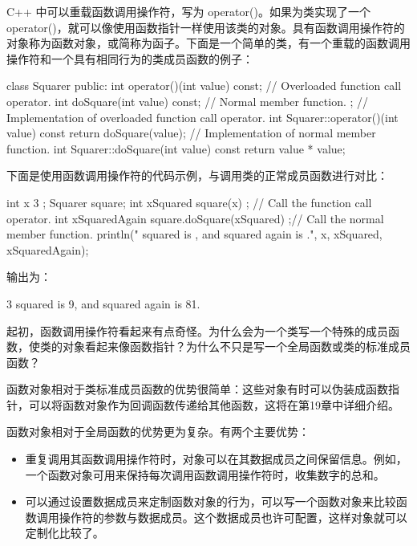 
C++ 中可以重载函数调用操作符，写为 operator()。如果为类实现了一个 operator()，就可以像使用函数指针一样使用该类的对象。具有函数调用操作符的对象称为函数对象，或简称为函子。下面是一个简单的类，有一个重载的函数调用操作符和一个具有相同行为的类成员函数的例子：

\begin{cpp}
class Squarer
{
    public:
        int operator()(int value) const; // Overloaded function call operator.
        int doSquare(int value) const; // Normal member function.
};
// Implementation of overloaded function call operator.
int Squarer::operator()(int value) const { return doSquare(value); }
// Implementation of normal member function.
int Squarer::doSquare(int value) const { return value * value; }
\end{cpp}

下面是使用函数调用操作符的代码示例，与调用类的正常成员函数进行对比：

\begin{cpp}
int x { 3 };
Squarer square;
int xSquared { square(x) }; // Call the function call operator.
int xSquaredAgain { square.doSquare(xSquared) };// Call the normal member function.
println("{} squared is {}, and squared again is {}.", x, xSquared, xSquaredAgain);
\end{cpp}

输出为：

\begin{shell}
3 squared is 9, and squared again is 81.
\end{shell}

起初，函数调用操作符看起来有点奇怪。为什么会为一个类写一个特殊的成员函数，使类的对象看起来像函数指针？为什么不只是写一个全局函数或类的标准成员函数？

函数对象相对于类标准成员函数的优势很简单：这些对象有时可以伪装成函数指针，可以将函数对象作为回调函数传递给其他函数，这将在第19章中详细介绍。

函数对象相对于全局函数的优势更为复杂。有两个主要优势：

\begin{itemize}
\item
重复调用其函数调用操作符时，对象可以在其数据成员之间保留信息。例如，一个函数对象可用来保持每次调用函数调用操作符时，收集数字的总和。

\item
可以通过设置数据成员来定制函数对象的行为，可以写一个函数对象来比较函数调用操作符的参数与数据成员。这个数据成员也许可配置，这样对象就可以定制化比较了。
\end{itemize}

